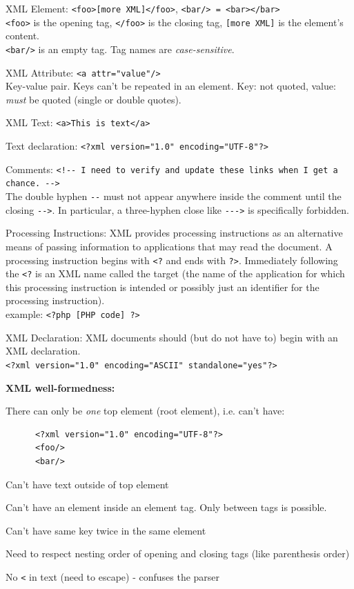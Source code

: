 \documentclass[11pt,oneside,a4paper]{article}
\begin{document}
\begin{compactitem}
	\item XML Element: \verb|<foo>[more XML]</foo>|, \verb|<bar/> = <bar></bar>|\\
	\verb|<foo>| is the opening tag, \verb|</foo>| is the closing tag, \verb|[more XML]| is the element's content.\\
	 \verb|<bar/>| is an empty tag. Tag names are \textit{case-sensitive}.
	\item XML Attribute: \verb|<a attr="value"/>|\\
	Key-value pair. Keys can't be repeated in an element. Key: not quoted, value: \textit{must} be quoted (single or double quotes).
	\item XML Text: \verb|<a>This is text</a>|
	\item Text declaration: \verb|<?xml version="1.0" encoding="UTF-8"?>|
	\item Comments: \verb|<!-- I need to verify and update these links when I get a chance. -->|\\
	The double hyphen \verb|--| must not appear anywhere inside the comment until the closing \verb|-->|. In particular, a three-hyphen close like \verb|--->| is specifically forbidden.
	\item Processing Instructions: XML provides processing instructions as an alternative means of passing information to applications that may read the document. A processing instruction begins with \verb|<?| and ends with \verb|?>|. Immediately following the \verb|<?| is an XML name called the target (the name of the application for which this processing instruction is intended or possibly just an identifier for the processing instruction).\\
	example: \verb|<?php [PHP code] ?>|
	\item XML Declaration: XML documents should (but do not have to) begin with an XML declaration.\\
	\verb|<?xml version="1.0" encoding="ASCII" standalone="yes"?>|
\end{compactitem}

\textbf{XML well-formedness:}

\begin{compactitem}
	\item There can only be \textit{one} top element (root element), i.e. can't have:
	\begin{verbatim}
	  <?xml version="1.0" encoding="UTF-8"?>
	  <foo/>
	  <bar/>
	\end{verbatim}
	\item Can't have text outside of top element
	\item Can't have an element inside an element tag. Only between tags is possible.
	\item Can't have same key twice in the same element
	\item Need to respect nesting order of opening and closing tags (like parenthesis order)
	\item No \verb|<| in text (need to escape) - confuses the parser
\end{compactitem}
\end{document}
